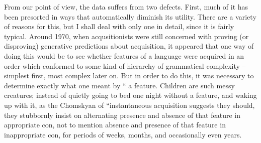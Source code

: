 From our point of view, the data suffers from two defects. First, much of it has been presorted in ways that automatically diminish its utility. There are a variety of reasons for this, but I shall deal with only one in detail, since it is fairly typical. Around 1970, when acqusitionists were still concerned with proving (or disproving) generative predictions about acquisition, it appeared that one way of doing this would be to see whether features of a language were acquired in an order which conformed to some kind of hierarchy of grammatical complexity -- simplest first, most complex later on. But in order to do this, it was necessary to determine exactly what one meant by `` a feature. Children are such messy creatures; instead of quietly going to bed one night without a feature, and waking up with it, as the Chomskyan  of ``instantaneous acquisition suggests they should, they stubbornly insist on alternating presence and absence of that feature in appropriate con, not to mention absence and presence of that feature in inappropriate con, for periods of weeks, months, and occasionally even years.

